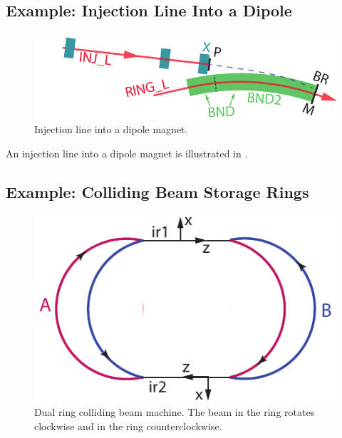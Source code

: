 \subsection{Example: Injection Line Into a Dipole}
\label{s:ex.inj}

\begin{figure}[tb]
  \centering
  \includegraphics[width=5in]{injection.pdf}
  \caption[Injection line into a dipole magnet.]{Injection line into a dipole magnet.}
  \label{f:inject}
\end{figure}

An injection line into a dipole magnet is illustrated in .



\subsection{Example: Colliding Beam Storage Rings}
\label{s:ex.collide}

\begin{figure}[tb]
  \centering
  \includegraphics[width=5in]{colliding-beams.pdf}
  \caption[Dual ring colliding beam machine]{Dual ring colliding beam machine. 
The beam in the  ring rotates clockwise and in the  ring
counterclockwise.}
  \label{f:collide}
\end{figure}

